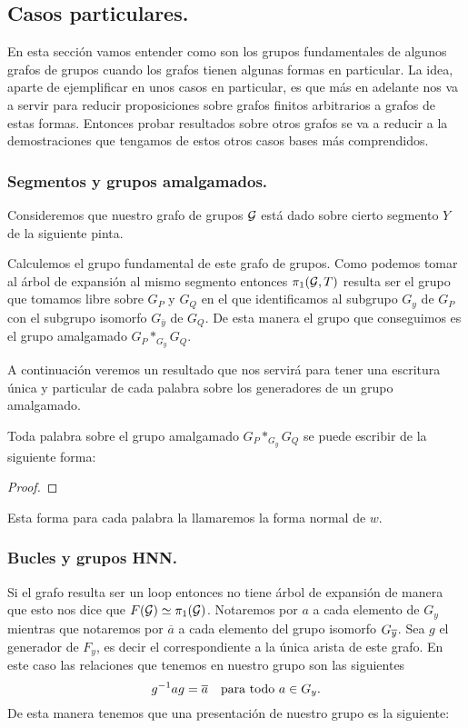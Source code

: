 \documentclass[tesis.tex]{subfiles}
\newcommand{\cG}{ {\cal G} }
\begin{document}
\subsection{Casos particulares.}

En esta sección vamos entender como son los grupos fundamentales de algunos grafos de grupos cuando los grafos tienen algunas formas en particular. 
La idea, aparte de ejemplificar en unos casos en particular, es que más en adelante nos va a servir para reducir proposiciones sobre grafos finitos arbitrarios a grafos de estas formas.
Entonces probar resultados sobre otros grafos se va a reducir a la demostraciones que tengamos de estos otros casos bases más comprendidos.

\subsubsection{Segmentos y grupos amalgamados.}
Consideremos que nuestro grafo de grupos $\cG$ está dado sobre cierto segmento $Y$ de la siguiente pinta.

Calculemos el grupo fundamental de este grafo de grupos.
Como podemos tomar al árbol de expansión al mismo segmento entonces $\pi_1(\cG, T)$ resulta ser el grupo que tomamos libre sobre $G_P$ y $G_Q$ en el que identificamos al subgrupo $G_y$ de $G_P$ con el subgrupo isomorfo $G_{\overline y}$ de $G_Q$.
De esta manera el grupo que conseguimos es el grupo amalgamado $G_P \ast_{G_y} G_Q$. 

A continuación veremos un resultado que nos servirá para tener una escritura única y particular de cada palabra sobre los generadores de un grupo amalgamado.
\begin{prop}
	Toda palabra sobre el grupo amalgamado $G_P \ast_{G_y} G_Q$ se puede escribir de la siguiente forma:
	
\end{prop}
\begin{proof}
\end{proof}
 
Esta forma para cada palabra la llamaremos la forma normal de $w$.
\subsubsection{Bucles y grupos HNN.}

Si el grafo resulta ser un loop
entonces no tiene árbol de expansión de manera que esto nos dice que $F(\cG) \simeq \pi_1(\cG)$.
Notaremos por $a$ a cada elemento de $G_y$ mientras que notaremos por $\overline{a}$ a cada elemento del grupo isomorfo $G_{\overline{y}}$.
Sea $g$ el generador de $F_{y}$, es decir el correspondiente a la única arista de este grafo. 
En este caso las relaciones que tenemos en nuestro grupo son las siguientes
\[
	g^{-1}ag = \overline{a}  \  \ \ \text{para todo} \ a \in G_y.
\]   
De esta manera tenemos que una presentación de nuestro grupo es la siguiente:
\end{document}

